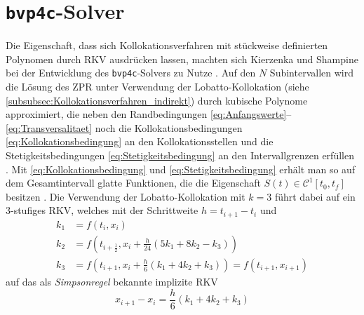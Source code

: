 \chapter{\texttt{bvp4c}-Solver}\label{app:bvp4c}
Die Eigenschaft, dass sich Kollokationsverfahren mit stückweise definierten Polynomen durch \gls{RKV} ausdrücken lassen, machten sich Kierzenka und Shampine bei der Entwicklung des \texttt{bvp4c}-Solvers zu Nutze \cite{Kierzenka.2001}. Auf den $N$ Subintervallen wird die Lösung des \gls{ZPR} unter Verwendung der Lobatto-Kollokation (siehe \ref{subsubsec:Kollokationsverfahren_indirekt}) durch kubische Polynome approximiert, die neben den Randbedingungen \eqref{eq:Anfangswerte}--\eqref{eq:Transversalitaet} noch die Kollokationsbedingungen \eqref{eq:Kollokationsbedingung} an den Kollokationsstellen und die Stetigkeitsbedingungen \eqref{eq:Stetigkeitsbedingung} an den Intervallgrenzen erfüllen \cite{Kierzenka.2001}. Mit \eqref{eq:Kollokationsbedingung} und \eqref{eq:Stetigkeitsbedingung} erhält man so auf dem Gesamtintervall glatte Funktionen, die die Eigenschaft $S(t) \in \mathcal{C}^1[t_0, t_f]$ besitzen \cite{Kierzenka.2001}. Die Verwendung der Lobatto-Kollokation mit $k=3$ führt dabei auf ein 3-stufiges \gls{RKV}, welches mit der Schrittweite $h=t_{i+1}-t_i$ und  
\begin{align}
k_1 &= f(t_i,x_i) \\
k_2 &= f(t_{i+\frac{1}{2}},x_i+\frac{h}{24}(5k_1+8k_2-k_3)) \\
k_3 &= f(t_{i+1},x_i+\frac{h}{6}(k_1+4k_2+k_3)) = f(t_{i+1},x_{i+1})
\end{align}
auf das als \textit{Simpsonregel} bekannte implizite \gls{RKV}
\begin{equation}
x_{i+1} - x_i = \frac{h}{6}(k_1+4k_2+k_3)
\end{equation} 
